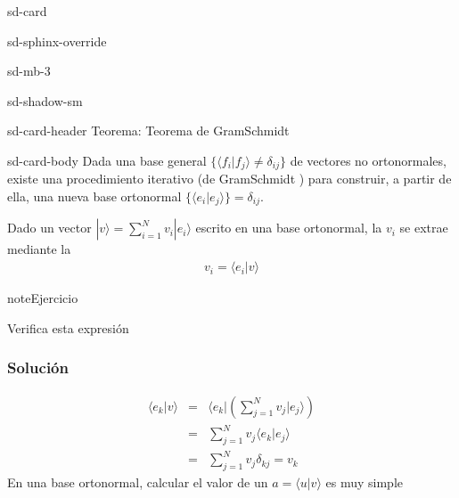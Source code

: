 \documentclass[letterpaper,10pt,english]{jupyterBook}
\newcommand{\bra}[1]{\langle #1|}
\newcommand{\ket}[1]{|#1\rangle}
\newcommand{\braket}[2]{\langle #1|#2\rangle}
\begin{document}
\begin{sphinxuseclass}{sd-card}
\begin{sphinxuseclass}{sd-sphinx-override}
\begin{sphinxuseclass}{sd-mb-3}
\begin{sphinxuseclass}{sd-shadow-sm}
\begin{sphinxuseclass}{sd-card-header}
\sphinxAtStartPar
Teorema: Teorema de Gram\sphinxhyphen{}Schmidt

\end{sphinxuseclass}
\begin{sphinxuseclass}{sd-card-body}
\sphinxAtStartPar
Dada una base general \(\{\braket{f_i}{f_j}\neq \delta_{ij}\}\) de vectores no ortonormales, existe una procedimiento iterativo (de Gram\sphinxhyphen{}Schmidt ) para construir, a partir de ella, una nueva base ortonormal \(\{\braket{e_i}{e_j}\}=\delta_{ij}\).

\end{sphinxuseclass}
\end{sphinxuseclass}
\end{sphinxuseclass}
\end{sphinxuseclass}
\end{sphinxuseclass}
\sphinxAtStartPar
Dado un vector  \(\ket{v} = \sum_{i=1}^N v_i \ket{e_i}\) escrito en una base ortonormal, la  \(v_i\) se extrae mediante la 
\begin{equation*}
\begin{split}
v_i =\braket{e_i}{v}
\end{split}
\end{equation*}
\begin{sphinxadmonition}{note}{Ejercicio}

\sphinxAtStartPar
Verifica esta expresión
\end{sphinxadmonition}
\subsubsection*{Solución}
\label{equation:docs/Part_01_Formalismo/Chapter_01_02_Formalismo_matemático/01_02_Vectores_myst:20254dbe-7e30-42f8-a865-08fa177745b9}\begin{eqnarray}
\braket{e_k}{v} &=&  \bra{e_k}\left(\sum_{j=1}^N v_j\ket{e_j}\right) \nonumber\\
                &=&  \sum_{j=1}^N  v_j\braket{e_k}{e_j}  \nonumber\\
                &=&  \sum_{j=1}^N  v_j\delta_{kj} = v_k
\end{eqnarray}
\sphinxAtStartPar
En una base ortonormal, calcular el valor de un  \(a=\braket{u}{v}\) es muy simple
\end{document}
